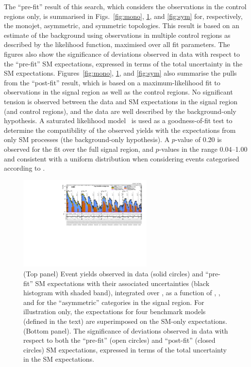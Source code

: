 The ``pre-fit'' result of this search, which considers the
observations in the control regions only, is summarised in
Figs.~\ref{fig:mono}, \ref{fig:asym}, and \ref{fig:sym} for,
respectively, the monojet, asymmetric, and symmetric topologies. This
result is based on an estimate of the \znunuj background using
observations in multiple control regions as described by the
likelihood function, maximised over all fit parameters. The figures
also show the significance of deviations observed in data with respect
to the ``pre-fit'' SM expectations, expressed in terms of the total
uncertainty in the SM expectations. Figures~\ref{fig:mono},
\ref{fig:asym}, and \ref{fig:sym} also summarise the pulls from the
``post-fit'' result, which is based on a maximum-likelihood fit to
observations in the signal region as well as the control regions. No
significant tension is observed between the data and SM expectations
in the signal region (and control regions), and the data are well
described by the background-only hypothesis. A saturated likelihood
model~\cite{} is used as a goodness-of-fit test to determine the
compatibility of the observed yields with the expectations from only
SM processes (\ie the background-only hypothesis). A $p$-value of 0.20
is observed for the fit over the full signal region, and $p$-values in
the range 0.04--1.00 and consistent with a uniform distribution when
considering events categorised according to \njet.

\begin{figure}[!h]
  \begin{center}
    \includegraphics[angle=90,width=0.6\textwidth]{figures/result/summaryPlot_Asymmetric_prefit_overlay_fit_b}
    \caption{(Top panel) Event yields observed in data (solid circles)
      and ``pre-fit'' SM expectations with their associated
      uncertainties (black histogram with shaded band), integrated
      over \HTmiss,  as a function
      of \njet, \nb, and \scalht for the ``asymmetric'' \njet categories
      in the signal region. For illustration only, the  
      expectations for four benchmark models (defined in the text) are
      superimposed on the SM-only expectations. (Bottom panel). The
      significance of deviations observed in data with respect to both
      the ``pre-fit'' (open circles) and ``post-fit'' (closed circles)
      SM expectations, expressed in terms of the total uncertainty in
      the SM expectations.  }
    \label{fig:asym}
  \end{center}
\end{figure}

